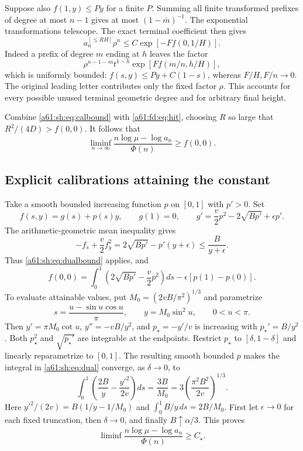 \documentclass[11pt,letterpaper]{article}
\numberwithin{equation}{section}
\theoremstyle{remark}\newtheorem{remark}[theorem]{Remark}
\newcommand{\st}{\star}
\begin{document}
Suppose also $f(1,y)\le Py$ for a finite $P$. Summing all finite transformed prefixes of degree at most $n-1$ gives at most $(1-\bar m)^{-1}$. The exponential transformations telescope. The exact terminal coefficient then gives
\begin{equation}\label{a61:sh:eq:calbound}
 a_n^{[\le RH]}\rho^n\le C\exp[-Ff(0,1/H)].
\end{equation}
Indeed a prefix of degree $m$ ending at $h$ leaves the factor
\[
 \rho^{n-1-m}t^{1-h}\exp[Ff(m/n,h/H)],
\]
which is uniformly bounded: $f(s,y)\le Py+C(1-s)$, whereas $F/H,F/n\to0$. The original leading letter contributes only the fixed factor $\rho$. This accounts for every possible unused terminal geometric degree and for arbitrary final height.

Combine \eqref{a61:sh:eq:calbound} with \eqref{a61:fd:eq:hit}, choosing $R$ so large that $R^2/(4D)>f(0,0)$. It follows that
\begin{equation}\label{a61:sh:eq:dualbound}
 \liminf_{n\to\infty}\frac{n\log\mu-\log a_n}{\Phi(n)}\ge f(0,0).
\end{equation}

\subsection{Explicit calibrations attaining the constant}
Take a smooth bounded increasing function $p$ on $[0,1]$ with $p'>0$. Set
\[
 f(s,y)=g(s)+p(s)y,\qquad g(1)=0,\qquad
 g'=\frac v2p^2-2\sqrt{Bp'}+\epsilon p'.
\]
The arithmetic-geometric mean inequality gives
\[
 -f_s+\frac v2f_y^2
 =2\sqrt{Bp'}-p'(y+\epsilon)\le\frac B{y+\epsilon}.
\]
Thus \eqref{a61:sh:eq:dualbound} applies, and
\begin{equation}\label{a61:sh:eq:dual}
 f(0,0)=\int_0^1\left(2\sqrt{Bp'}-\frac v2p^2\right)ds
 -\epsilon[p(1)-p(0)].
\end{equation}
To evaluate attainable values, put $M_0=(2vB/\pi^2)^{1/3}$ and parametrize
\[
 s=\frac{u-\sin u\cos u}{\pi},\qquad y=M_0\sin^2u,
 \qquad 0<u<\pi.
\]
Then $y'=\pi M_0\cot u$, $y''=-vB/y^2$, and $p_\st=-y'/v$ is increasing with $p_\st'=B/y^2$. Both $p_\st^2$ and $\sqrt{p_\st'}$ are integrable at the endpoints. Restrict $p_\st$ to $[\delta,1-\delta]$ and linearly reparametrize to $[0,1]$. The resulting smooth bounded $p$ makes the integral in \eqref{a61:sh:eq:dual} converge, as $\delta\to0$, to
\[
 \int_0^1\left(\frac{2B}{y}-\frac{y'^2}{2v}\right)ds
 =\frac{3B}{M_0}=3\left(\frac{\pi^2B^2}{2v}\right)^{1/3}.
\]
Here $y'^2/(2v)=B(1/y-1/M_0)$ and $\int_0^1 B/y\,ds=2B/M_0$. First let $\epsilon\to0$ for each fixed truncation, then $\delta\to0$, and finally $B\uparrow\alpha/3$. This proves
\begin{equation}\label{a61:sh:eq:liminf}
 \liminf\frac{n\log\mu-\log a_n}{\Phi(n)}\ge C_\st.
\end{equation}
\end{document}
